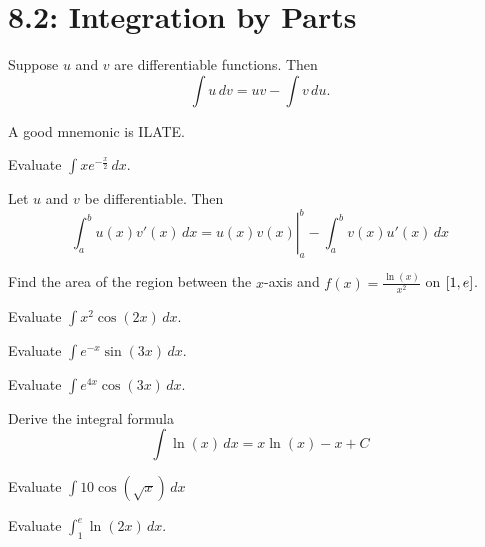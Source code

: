 \documentclass[../mathNotesPreamble]{subfiles}
\begin{document}
  \section{8.2: Integration by Parts}
  \begin{thmBox*}
    Suppose $u$ and $v$ are differentiable functions. Then
      \[\int u\,dv=uv-\int v\,du.\]
  \end{thmBox*}
  A good mnemonic is ILATE.
  \pagebreak

  \begin{ex*}
    Evaluate $\displaystyle\int xe^{-\frac{x}{2}}\,dx$.
  \end{ex*}
  \pagebreak

  \begin{thmBox*}
    Let $u$ and $v$ be differentiable. Then
      \[\left.\int_a^b u(x) v'(x)\,dx= u(x)v(x)\right|_a^b -\int_a^b v(x)u'(x)\,dx\]
  \end{thmBox*}
  \begin{ex*}
    Find the area of the region between the $x$-axis and $f(x)=\displaystyle\frac{\ln(x)}{x^2}$ on ${\left[1,e\right]}$.
  \end{ex*}
  \pagebreak

  \begin{ex*}
    Evaluate $\displaystyle\int x^2 \cos(2x)\,dx$.
  \end{ex*}
  \pagebreak

  \begin{ex*}
    Evaluate $\displaystyle\int e^{-x}\sin(3x)\,dx$.
  \end{ex*}
  \pagebreak

  \begin{ex*}
    Evaluate $\displaystyle\int e^{4x}\cos(3x)\,dx$.
  \end{ex*}
  \pagebreak

  \begin{ex*}
    Derive the integral formula 
      \[\int \ln(x)\,dx=x\ln(x)-x+C\]
  \end{ex*}

  \begin{ex*}
    Evaluate $\displaystyle\int10\cos(\sqrt{x})\,dx$
  \end{ex*}
  \pagebreak

  \begin{ex*}
    Evaluate $\displaystyle \int_1^e \ln(2x)\,dx$.
  \end{ex*}
  \pagebreak
\end{document}

